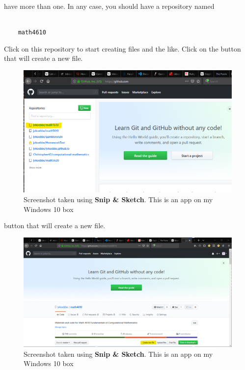 \documentclass[10pt,fleqn]{article}
\begin{document}
have more than one. In any case, you should have a repository named
\begin{verbatim}

    math4610

\end{verbatim}
Click on this repository to start creating files and the like. Click on the
button that will create a new file.
\vfill
\begin{figure}[h]
\centering
\includegraphics{../images/github_03.png}
\caption{{Screenshot} taken using {\bf Snip \& Sketch}. This is an app on
         my Windows 10 box}
\end{figure}
\eject
button that will create a new file.
\vfill
\begin{figure}[h]
\centering
\includegraphics{../images/github_04.png}
\caption{{Screenshot} taken using {\bf Snip \& Sketch}. This is an app on
         my Windows 10 box}
\end{figure}
\eject
\end{document}

